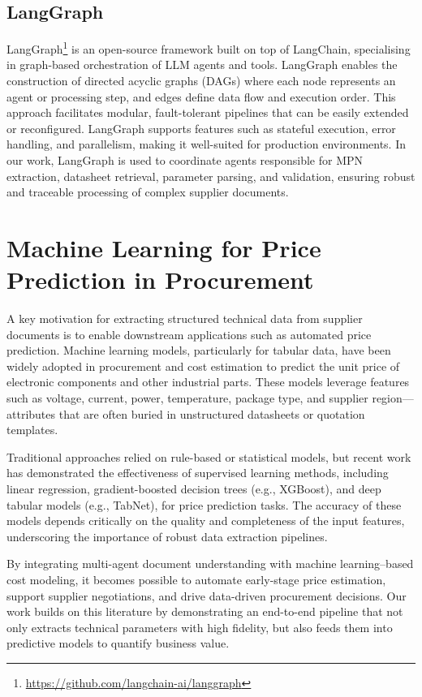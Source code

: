 \subsection{LangGraph}
LangGraph\footnote{\url{https://github.com/langchain-ai/langgraph}} is an open-source framework built on top of LangChain, specialising in graph-based orchestration of LLM agents and tools. LangGraph enables the construction of directed acyclic graphs (DAGs) where each node represents an agent or processing step, and edges define data flow and execution order. This approach facilitates modular, fault-tolerant pipelines that can be easily extended or reconfigured. LangGraph supports features such as stateful execution, error handling, and parallelism, making it well-suited for production environments. In our work, LangGraph is used to coordinate agents responsible for MPN extraction, datasheet retrieval, parameter parsing, and validation, ensuring robust and traceable processing of complex supplier documents.

\section{Machine Learning for Price Prediction in Procurement}
A key motivation for extracting structured technical data from supplier documents is to enable downstream applications such as automated price prediction. Machine learning models, particularly for tabular data, have been widely adopted in procurement and cost estimation to predict the unit price of electronic components and other industrial parts. These models leverage features such as voltage, current, power, temperature, package type, and supplier region—attributes that are often buried in unstructured datasheets or quotation templates.

Traditional approaches relied on rule-based or statistical models, but recent work has demonstrated the effectiveness of supervised learning methods, including linear regression, gradient-boosted decision trees (e.g., XGBoost), and deep tabular models (e.g., TabNet), for price prediction tasks. The accuracy of these models depends critically on the quality and completeness of the input features, underscoring the importance of robust data extraction pipelines.

By integrating multi-agent document understanding with machine learning–based cost modeling, it becomes possible to automate early-stage price estimation, support supplier negotiations, and drive data-driven procurement decisions. Our work builds on this literature by demonstrating an end-to-end pipeline that not only extracts technical parameters with high fidelity, but also feeds them into predictive models to quantify business value.

